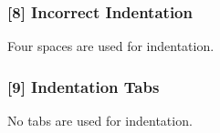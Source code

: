 \subsubsection{[8] Incorrect Indentation}
Four spaces are used for indentation.
\subsubsection{[9] Indentation Tabs}
No tabs are used for indentation.